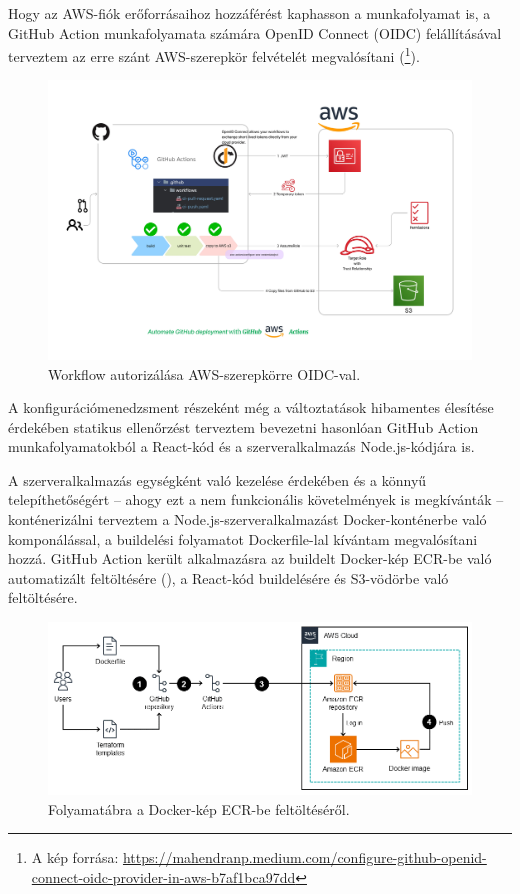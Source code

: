 Hogy az AWS-fiók erőforrásaihoz hozzáférést kaphasson a munkafolyamat is, a GitHub Action munkafolyamata számára OpenID Connect (OIDC) felállításával terveztem az erre szánt AWS-szerepkör felvételét megvalósítani (\footnote{A kép forrása: \url{https://mahendranp.medium.com/configure-github-openid-connect-oidc-provider-in-aws-b7af1bca97dd}}). \cite{githuboidc}

\begin{figure}[ht]
	\centering
	\includegraphics[width=150mm, keepaspectratio]{figures/githuboidc.png}
	\caption{Workflow autorizálása AWS-szerepkörre OIDC-val.}
	\label{fig:githuboidc}
\end{figure}

A konfigurációmenedzsment részeként még a változtatások hibamentes élesítése érdekében statikus ellenőrzést terveztem bevezetni hasonlóan GitHub Action munkafolyamatokból a React-kód és a szerveralkalmazás Node.js-kódjára is.

A szerveralkalmazás egységként való kezelése érdekében és a könnyű telepíthetőségért -- ahogy ezt a nem funkcionális követelmények is megkívánták -- konténerizálni terveztem a Node.js-szerveralkalmazást Docker-konténerbe való komponálással, a buildelési folyamatot Dockerfile-lal kívántam megvalósítani hozzá. GitHub Action került alkalmazásra az buildelt Docker-kép ECR-be való automatizált feltöltésére (), a React-kód buildelésére és S3-vödörbe való feltöltésére.

\begin{figure}[ht]
	\centering
	\includegraphics[width=140mm, keepaspectratio]{figures/ecr.png}
	\caption{Folyamatábra a Docker-kép ECR-be feltöltéséről.}
	\label{fig:ecr}
\end{figure}

